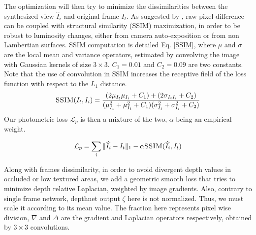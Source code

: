 \documentclass[runningheads]{llncs}
\begin{document}
The optimization will then try to minimize the dissimilarities between the synthesized view $\widehat{I}_i$ and original frame $I_t$. As suggested by \cite{monodepth17}, raw pixel difference can be coupled with structural similarity (SSIM) \cite{wang2004image} maximization, in order to be robust to luminosity changes, either from camera auto-exposition or from non Lambertian surfaces. SSIM computation is detailed Eq. \ref{SSIM}, where $\mu$ and $\sigma$ are the local mean and variance operators, estimated by convolving  
the image with Gaussian kernels of size $3 \times 3$.
$C_1 = 0.01$ and $C_2 = 0.09$ are two constants.
Note that the use of convolution in SSIM increases the receptive field of the loss function with respect to the $L_1$ distance. 
\begin{equation}
\label{SSIM}
 \textsc{SSIM}(I_t, I_i) = \frac{(2\mu_{I_t}\mu_{I_i} + C_1) + (2 \sigma _{I_tI_i} + C_2)} 
    {(\mu_{I_t}^2 + \mu_{I_i}^2+C_1) (\sigma_{I_t}^2 + \sigma_{I_i}^2+C_2)}
\end{equation}
Our photometric loss $\mathcal{L}_p$ is then a mixture of the two, $\alpha$ being an empirical weight.

\begin{equation}
\mathcal{L}_p = \sum_i \Vert \widehat{I}_i - I_t\Vert_1 - \alpha \textsc{SSIM}(\widehat{I}_i, I_t)
\end{equation}

Along with frames dissimilarity, in order to avoid divergent depth values in occluded or low textured areas, we add a geometric smooth loss that tries to minimize depth relative Laplacian, weighted by image gradients. Also, contrary to single frame network, depthnet output $\zeta$ here is not normalized. Thus, we must scale it according to its mean value. The fraction here represents pixel wise division, $\nabla$ and $\Delta$ are the gradient and Laplacian operators respectively, obtained by $3\times3$ convolutions.
\end{document}
